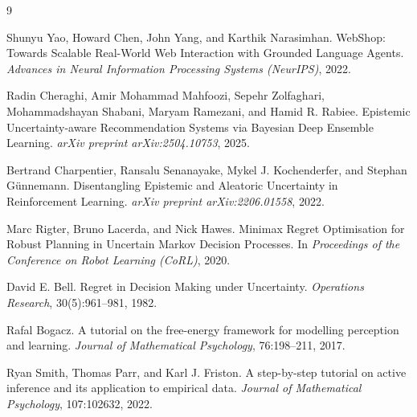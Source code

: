 \documentclass[11pt]{article}
\begin{document}
\begin{thebibliography}{9}

Shunyu Yao, Howard Chen, John Yang, and Karthik Narasimhan.
\newblock WebShop: Towards Scalable Real-World Web Interaction with Grounded Language Agents.
\newblock \emph{Advances in Neural Information Processing Systems (NeurIPS)}, 2022.

Radin Cheraghi, Amir Mohammad Mahfoozi, Sepehr Zolfaghari, Mohammadshayan Shabani, Maryam Ramezani, and Hamid R. Rabiee.
\newblock Epistemic Uncertainty-aware Recommendation Systems via Bayesian Deep Ensemble Learning.
\newblock \emph{arXiv preprint arXiv:2504.10753}, 2025.

Bertrand Charpentier, Ransalu Senanayake, Mykel J. Kochenderfer, and Stephan G{\"u}nnemann.
\newblock Disentangling Epistemic and Aleatoric Uncertainty in Reinforcement Learning.
\newblock \emph{arXiv preprint arXiv:2206.01558}, 2022.

Marc Rigter, Bruno Lacerda, and Nick Hawes.
\newblock Minimax Regret Optimisation for Robust Planning in Uncertain Markov Decision Processes.
\newblock In \emph{Proceedings of the Conference on Robot Learning (CoRL)}, 2020.

David E. Bell.
\newblock Regret in Decision Making under Uncertainty.
\newblock \emph{Operations Research}, 30(5):961--981, 1982.

Rafal Bogacz.
\newblock A tutorial on the free-energy framework for modelling perception and learning.
\newblock \emph{Journal of Mathematical Psychology}, 76:198--211, 2017.

Ryan Smith, Thomas Parr, and Karl J. Friston.
\newblock A step-by-step tutorial on active inference and its application to empirical data.
\newblock \emph{Journal of Mathematical Psychology}, 107:102632, 2022.

\end{thebibliography}
\end{document}

